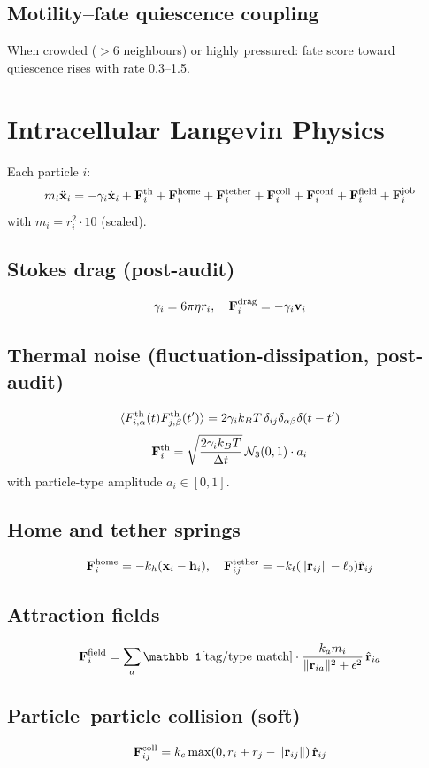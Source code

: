 \documentclass[11pt,a4paper]{article}
\newcommand{\eq}[1]{\begin{equation}#1\end{equation}}
\begin{document}
\subsection{Motility--fate quiescence coupling}
When crowded ($>6$ neighbours) or highly pressured: fate score toward quiescence rises with rate 0.3--1.5.

\clearpage
\section{Intracellular Langevin Physics}
\label{sec:langevin}

Each particle $i$:
\eq{ m_i\ddot{\mathbf x}_i = -\gamma_i\dot{\mathbf x}_i + \mathbf F^{\rm th}_i + \mathbf F^{\rm home}_i + \mathbf F^{\rm tether}_i + \mathbf F^{\rm coll}_i + \mathbf F^{\rm conf}_i + \mathbf F^{\rm field}_i + \mathbf F^{\rm job}_i }
with $m_i = r_i^2\cdot 10$ (scaled).

\subsection{Stokes drag (post-audit)}
\eq{ \gamma_i = 6\pi\eta r_i,\quad \mathbf F^{\rm drag}_i=-\gamma_i\mathbf v_i }

\subsection{Thermal noise (fluctuation-dissipation, post-audit)}
\eq{ \langle F^{\rm th}_{i,\alpha}(t)F^{\rm th}_{j,\beta}(t')\rangle = 2\gamma_i k_BT\,\delta_{ij}\delta_{\alpha\beta}\delta(t-t') }
\eq{ \mathbf F^{\rm th}_i=\sqrt{\frac{2\gamma_i k_BT}{\Delta t}}\,\mathcal N_3(0,1)\cdot a_i }
with particle-type amplitude $a_i\in[0,1]$.

\subsection{Home and tether springs}
\eq{ \mathbf F^{\rm home}_i = -k_h(\mathbf x_i-\mathbf h_i),\quad \mathbf F^{\rm tether}_{ij}=-k_t(\|\mathbf r_{ij}\|-\ell_0)\hat{\mathbf r}_{ij} }

\subsection{Attraction fields}
\eq{ \mathbf F^{\rm field}_i = \sum_a \mathbb 1[\text{tag/type match}]\cdot\frac{k_a m_i}{\|\mathbf r_{ia}\|^2+\epsilon^2}\,\hat{\mathbf r}_{ia} }

\subsection{Particle--particle collision (soft)}
\eq{ \mathbf F^{\rm coll}_{ij}=k_c\max(0,r_i+r_j-\|\mathbf r_{ij}\|)\,\hat{\mathbf r}_{ij} }
\end{document}

